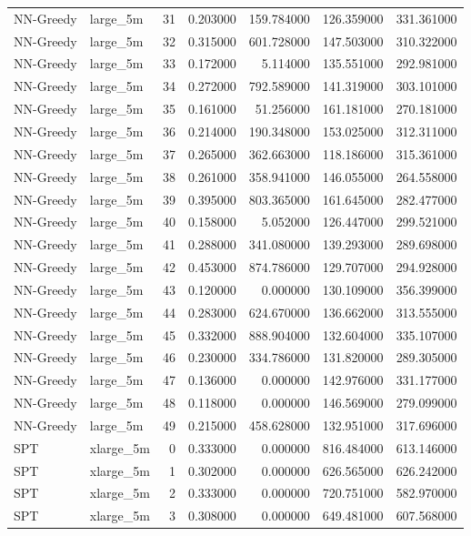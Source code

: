 \begin{tabular}{llrrrrr}
NN-Greedy & large_5m & 31 & 0.203000 & 159.784000 & 126.359000 & 331.361000 \\
NN-Greedy & large_5m & 32 & 0.315000 & 601.728000 & 147.503000 & 310.322000 \\
NN-Greedy & large_5m & 33 & 0.172000 & 5.114000 & 135.551000 & 292.981000 \\
NN-Greedy & large_5m & 34 & 0.272000 & 792.589000 & 141.319000 & 303.101000 \\
NN-Greedy & large_5m & 35 & 0.161000 & 51.256000 & 161.181000 & 270.181000 \\
NN-Greedy & large_5m & 36 & 0.214000 & 190.348000 & 153.025000 & 312.311000 \\
NN-Greedy & large_5m & 37 & 0.265000 & 362.663000 & 118.186000 & 315.361000 \\
NN-Greedy & large_5m & 38 & 0.261000 & 358.941000 & 146.055000 & 264.558000 \\
NN-Greedy & large_5m & 39 & 0.395000 & 803.365000 & 161.645000 & 282.477000 \\
NN-Greedy & large_5m & 40 & 0.158000 & 5.052000 & 126.447000 & 299.521000 \\
NN-Greedy & large_5m & 41 & 0.288000 & 341.080000 & 139.293000 & 289.698000 \\
NN-Greedy & large_5m & 42 & 0.453000 & 874.786000 & 129.707000 & 294.928000 \\
NN-Greedy & large_5m & 43 & 0.120000 & 0.000000 & 130.109000 & 356.399000 \\
NN-Greedy & large_5m & 44 & 0.283000 & 624.670000 & 136.662000 & 313.555000 \\
NN-Greedy & large_5m & 45 & 0.332000 & 888.904000 & 132.604000 & 335.107000 \\
NN-Greedy & large_5m & 46 & 0.230000 & 334.786000 & 131.820000 & 289.305000 \\
NN-Greedy & large_5m & 47 & 0.136000 & 0.000000 & 142.976000 & 331.177000 \\
NN-Greedy & large_5m & 48 & 0.118000 & 0.000000 & 146.569000 & 279.099000 \\
NN-Greedy & large_5m & 49 & 0.215000 & 458.628000 & 132.951000 & 317.696000 \\
SPT & xlarge_5m & 0 & 0.333000 & 0.000000 & 816.484000 & 613.146000 \\
SPT & xlarge_5m & 1 & 0.302000 & 0.000000 & 626.565000 & 626.242000 \\
SPT & xlarge_5m & 2 & 0.333000 & 0.000000 & 720.751000 & 582.970000 \\
SPT & xlarge_5m & 3 & 0.308000 & 0.000000 & 649.481000 & 607.568000 \\

\end{tabular}
